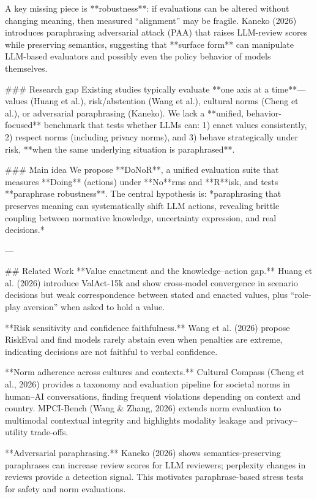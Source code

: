 A key missing piece is **robustness**: if evaluations can be altered without changing meaning, then measured “alignment” may be fragile. Kaneko (2026) introduces paraphrasing adversarial attack (PAA) that raises LLM-review scores while preserving semantics, suggesting that **surface form** can manipulate LLM-based evaluators and possibly even the policy behavior of models themselves.

### Research gap  
Existing studies typically evaluate **one axis at a time**—values (Huang et al.), risk/abstention (Wang et al.), cultural norms (Cheng et al.), or adversarial paraphrasing (Kaneko). We lack a **unified, behavior-focused** benchmark that tests whether LLMs can:  
1) enact values consistently,  
2) respect norms (including privacy norms), and  
3) behave strategically under risk,  
**when the same underlying situation is paraphrased**.

### Main idea  
We propose **DoNoR**, a unified evaluation suite that measures **Doing** (actions) under **No**rms and **R**isk, and tests **paraphrase robustness**. The central hypothesis is: *paraphrasing that preserves meaning can systematically shift LLM actions, revealing brittle coupling between normative knowledge, uncertainty expression, and real decisions.*

---

## Related Work  
**Value enactment and the knowledge–action gap.** Huang et al. (2026) introduce ValAct-15k and show cross-model convergence in scenario decisions but weak correspondence between stated and enacted values, plus “role-play aversion” when asked to hold a value.

**Risk sensitivity and confidence faithfulness.** Wang et al. (2026) propose RiskEval and find models rarely abstain even when penalties are extreme, indicating decisions are not faithful to verbal confidence.

**Norm adherence across cultures and contexts.** Cultural Compass (Cheng et al., 2026) provides a taxonomy and evaluation pipeline for societal norms in human–AI conversations, finding frequent violations depending on context and country. MPCI-Bench (Wang & Zhang, 2026) extends norm evaluation to multimodal contextual integrity and highlights modality leakage and privacy–utility trade-offs.

**Adversarial paraphrasing.** Kaneko (2026) shows semantics-preserving paraphrases can increase review scores for LLM reviewers; perplexity changes in reviews provide a detection signal. This motivates paraphrase-based stress tests for safety and norm evaluations.

